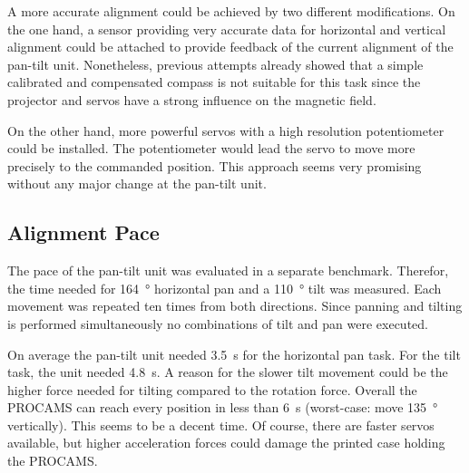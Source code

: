 A more accurate alignment could be achieved by two different modifications. On the one hand, a sensor providing very accurate data for horizontal and vertical alignment could be attached to provide feedback of the current alignment of the pan-tilt unit. Nonetheless, previous attempts already showed that a simple calibrated and compensated compass is not suitable for this task since the projector and servos have a strong influence on the magnetic field.

On the other hand, more powerful servos with a high resolution potentiometer could be installed. The potentiometer would lead the servo to move more precisely to the commanded position. This approach seems very promising without any major change at the pan-tilt unit. 

\subsection{Alignment Pace}
The pace of the pan-tilt unit was evaluated in a separate benchmark. Therefor, the time needed for \SI{164}{\degree} horizontal pan and a \SI{110}{\degree} tilt was measured. Each movement was repeated ten times from both directions. Since panning and tilting is performed simultaneously no combinations of tilt and pan were executed.

On average the pan-tilt unit needed \SI{3.5}{\second} for the horizontal pan task. For the tilt task, the unit needed \SI{4.8}{\second}. A reason for the slower tilt movement could be the higher force needed for tilting compared to the rotation force. Overall the PROCAMS can reach every position in less than \SI{6}{\second} (worst-case: move \SI{135}{\degree} vertically). This seems to be a decent time.
Of course, there are faster servos available, but higher acceleration forces could damage the printed case holding the PROCAMS. 


